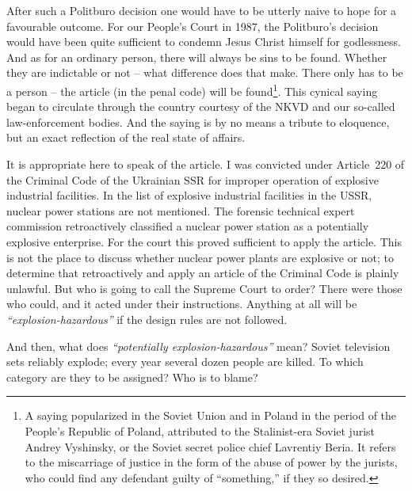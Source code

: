 \documentclass[openright]{bookest}
\begin{document}
After such a Politburo decision one would have to be utterly naive to hope for a favourable outcome. For our People's Court in 1987, the Politburo's decision would have been quite sufficient to condemn Jesus Christ himself for godlessness. And as for an ordinary person, there will always be sins to be found. Whether they are indictable or not -- what difference does that make. There only has to be a person -- the article (in the penal code) will be found\footnote{A saying popularized in the Soviet Union and in Poland in the period of the People's Republic of Poland, attributed to the Stalinist-era Soviet jurist Andrey Vyshinsky, or the Soviet secret police chief Lavrentiy Beria. It refers to the miscarriage of justice in the form of the abuse of power by the jurists, who could find any defendant guilty of ``something,'' if they so desired.}. This cynical saying began to circulate through the country courtesy of the NKVD and our so-called law-enforcement bodies. And the saying is by no means a tribute to eloquence, but an exact reflection of the real state of affairs.

It is appropriate here to speak of the article. I was convicted under Article~220 of the Criminal Code of the Ukrainian SSR for improper operation of explosive industrial facilities. In the list of explosive industrial facilities in the USSR, nuclear power stations are not mentioned. The forensic technical expert commission retroactively classified a nuclear power station as a potentially explosive enterprise. For the court this proved sufficient to apply the article. This is not the place to discuss whether nuclear power plants are explosive or not; to determine that retroactively and apply an article of the Criminal Code is plainly unlawful. But who is going to call the Supreme Court to order? There were those who could, and it acted under their instructions. Anything at all will be \textit{``explosion-hazardous''} if the design rules are not followed.

And then, what does \textit{``potentially explosion-hazardous''} mean? Soviet television sets reliably explode; every year several dozen people are killed. To which category are they to be assigned? Who is to blame?
\end{document}
